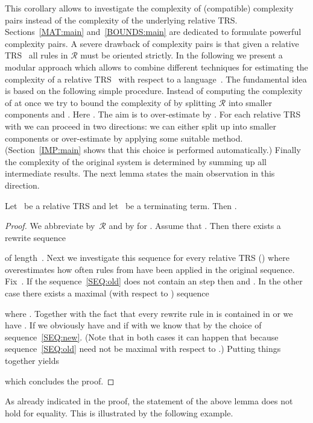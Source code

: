 \documentclass{LMCS}
\theoremstyle{plain}\newtheorem{mainthm}[thm]{Main Theorem}
\newcommand\TRS[1]{\ensuremath{\mathcal{#1}}}
\newcommand\REL[2]{{\text{\ensuremath{#1 \kern0em/\kern0em #2}}}}
\begin{document}
This corollary allows to investigate the complexity of (compatible)
complexity pairs instead of the complexity of the underlying relative
TRS. Sections~\ref{MAT:main} and~\ref{BOUNDS:main} are dedicated to
formulate powerful complexity pairs.
A severe drawback of complexity pairs is that given a relative
TRS~\REL{\TRS{R}}{\TRS{S}} all rules in \TRS{R} must be oriented
strictly. In the following we present a modular approach which allows
to combine different techniques for estimating the complexity of a relative
TRS~\REL{\TRS{R}}{\TRS{S}} with respect to a language~. The fundamental
idea is based on the following simple procedure. Instead of computing the
complexity of \REL{\TRS{R}}{\TRS{S}} at once we try to bound the
complexity of \REL{\TRS{R}}{\TRS{S}} by splitting \TRS{R} into smaller
components  and . Here
. The aim is to over-estimate
 by
.
For each relative TRS 
with  we can proceed in two directions: we can either
split up  into smaller components or over-estimate
 by applying
some suitable method. (Section~\ref{IMP:main} shows that this choice is
performed automatically.) Finally the complexity of the original system is
determined by summing up all intermediate results. The next
lemma states the main observation in this direction.

\begin{lem}
\label{LEM:mod}
Let~ be a relative TRS and
let~ be a terminating term. Then
 .
\end{lem}
\begin{proof}
We abbreviate  by~\TRS{R}
and  by  for .
Assume that .
Then there exists a rewrite sequence

of length~. Next we investigate this sequence for every relative
TRS  ()
where  overestimates how often rules from  have been
applied in the original sequence.
Fix~. If the sequence~\eqref{SEQ:old} does not contain an 
step then 
and . In the other case there exists a maximal
(with respect to ) sequence

where . Together with the
fact that every rewrite rule in  is contained in 
or  we have . If  we obviously
have  and
if  with  we know
that  by the
choice of sequence~\eqref{SEQ:new}. (Note that in both cases it can
happen that  because
sequence~\eqref{SEQ:old} need not be maximal with respect to
.) Putting things together yields

which concludes the proof.
\end{proof}

As already indicated in the proof, the statement of the above lemma
does not hold for equality. This is illustrated by the following example.
\end{document}
